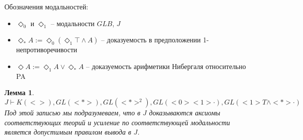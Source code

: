 \documentclass[12pt,a4paper,oneside]{article}
\newtheorem{lemma}{Лемма}
\begin{document}
  Обозначения модальностей:
  \begin{itemize}
    \item $\Diamond_0 $ и $\Diamond_1 $ -- модальности $GLB$, $J$
    \item $\Diamond_* A := \Diamond_0 (\Diamond_1 \top \wedge A)$ -- доказуемость в
          предположении 1-непротиворечивости
    \item $\Diamond A := \Diamond_1 A \vee \Diamond_* A$ -- доказуемость
          арифметики Нибергаля относительно PA
  \end{itemize}

  \begin{lemma}
    $J \vdash K(<>), GL(<*>), GL(<*>^2), GL(<0><1>\cdot), GL(<1>T \wedge <*>\cdot)$\\ Под
    этой записью мы подразумеваем, что в $J$ доказываются
    аксиомы соответствующих теорий и усиление по
    соответствующей модальности является допустимым
    правилом вывода в $J$.
  \end{lemma}
\end{document}
